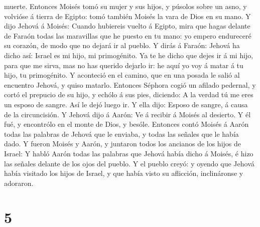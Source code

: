 muerte.  Entonces Moisés tomó su mujer y sus hijos, y
púsolos sobre un asno, y volvióse á tierra de Egipto: tomó también
Moisés la vara de Dios en su mano.  Y dijo Jehová á Moisés:
Cuando hubiereis vuelto á Egipto, mira que hagas delante de Faraón todas
las maravillas que he puesto en tu mano: yo empero endureceré su
corazón, de modo que no dejará ir al pueblo.  Y dirás á
Faraón: Jehová ha dicho así: Israel es mi hijo, mi primogénito.
 Ya te he dicho que dejes ir á mi hijo, para que me sirva,
mas no has querido dejarlo ir: he aquí yo voy á matar á tu hijo, tu
primogénito.  Y aconteció en el camino, que en una posada
le salió al encuentro Jehová, y quiso matarlo.  Entonces
Séphora cogió un afilado pedernal, y cortó el prepucio de su hijo, y
echólo á sus pies, diciendo: A la verdad tú me eres un esposo de sangre.
 Así le dejó luego ir. Y ella dijo: Esposo de sangre, á
causa de la circuncisión.  Y Jehová dijo á Aarón: Ve á
recibir á Moisés al desierto. Y él fué, y encontrólo en el monte de
Dios, y besóle.  Entonces contó Moisés á Aarón todas las
palabras de Jehová que le enviaba, y todas las señales que le había
dado.  Y fueron Moisés y Aarón, y juntaron todos los
ancianos de los hijos de Israel:  Y habló Aarón todas las
palabras que Jehová había dicho á Moisés, é hizo las señales delante de
los ojos del pueblo.  Y el pueblo creyó: y oyendo que
Jehová había visitado los hijos de Israel, y que había visto su
aflicción, inclináronse y adoraron.

\hypertarget{section-4}{%
\section{5}\label{section-4}}

